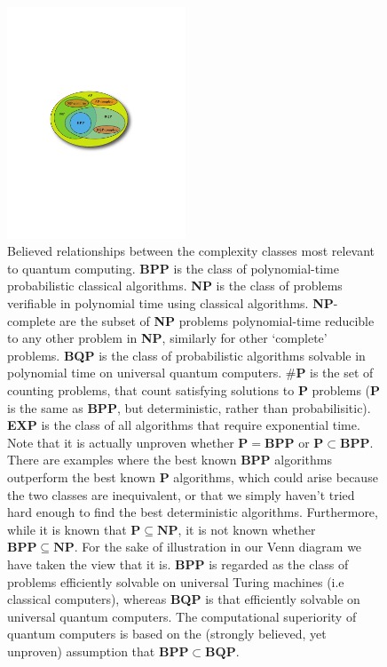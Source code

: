 \begin{figure}[!htbp]
	\includegraphics[clip=true, width=0.475\textwidth]{complexity_classes}     
	\vspace{-1.2em} \captionspacefig \caption{Believed relationships between the complexity classes most relevant to quantum computing. \textbf{BPP} is the class of polynomial-time probabilistic classical algorithms. \textbf{NP} is the class of problems verifiable in polynomial time using classical algorithms. \textbf{NP}-complete are the subset of \textbf{NP} problems polynomial-time reducible to any other problem in \textbf{NP}, similarly for other `complete' problems. \textbf{BQP} is the class of probabilistic algorithms solvable in polynomial time on universal quantum computers. $\#\mathbf{P}$ is the set of counting problems, that count satisfying solutions to \textbf{P} problems (\textbf{P} is the same as \textbf{BPP}, but deterministic, rather than probabilisitic). \textbf{EXP} is the class of all algorithms that require exponential time. Note that it is actually unproven whether \mbox{$\mathbf{P}=\mathbf{BPP}$} or \mbox{$\mathbf{P}\subset\mathbf{BPP}$}. There are examples where the best known \textbf{BPP} algorithms outperform the best known \textbf{P} algorithms, which could arise because the two classes are inequivalent, or that we simply haven't tried hard enough to find the best deterministic algorithms. Furthermore, while it is known that \mbox{$\mathbf{P}\subseteq\mathbf{NP}$}, it is not known whether \mbox{$\mathbf{BPP}\subseteq\mathbf{NP}$}. For the sake of illustration in our Venn diagram we have taken the view that it is. \textbf{BPP} is regarded as the class of problems efficiently solvable on universal Turing machines (i.e classical computers), whereas \textbf{BQP} is that efficiently solvable on universal quantum computers. The computational superiority of quantum computers is based on the (strongly believed, yet unproven) assumption that \mbox{$\mathbf{BPP}\subset\mathbf{BQP}$}.} \label{fig:complexity_classes}
\end{figure}

